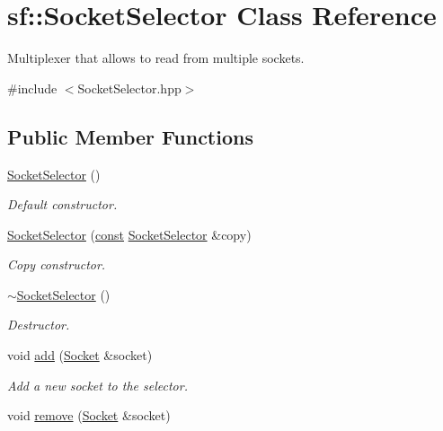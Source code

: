\hypertarget{classsf_1_1_socket_selector}{\section{sf\-:\-:Socket\-Selector Class Reference}
\label{classsf_1_1_socket_selector}
}


Multiplexer that allows to read from multiple sockets.  




{\ttfamily \#include $<$Socket\-Selector.\-hpp$>$}

\subsection*{Public Member Functions}
\begin{DoxyCompactItemize}
\item 
\hyperlink{classsf_1_1_socket_selector_a741959c5158aeb1e4457cad47d90f76b}{Socket\-Selector} ()
\begin{DoxyCompactList}\small\item\em Default constructor. \end{DoxyCompactList}\item 
\hyperlink{classsf_1_1_socket_selector_a50b1b955eb7ecb2e7c2764f3f4722fbf}{Socket\-Selector} (\hyperlink{term__entry_8h_a57bd63ce7f9a353488880e3de6692d5a}{const} \hyperlink{classsf_1_1_socket_selector}{Socket\-Selector} \&copy)
\begin{DoxyCompactList}\small\item\em Copy constructor. \end{DoxyCompactList}\item 
\hyperlink{classsf_1_1_socket_selector_a9069cd61208260b8ed9cf233afa1f73d}{$\sim$\-Socket\-Selector} ()
\begin{DoxyCompactList}\small\item\em Destructor. \end{DoxyCompactList}\item 
void \hyperlink{classsf_1_1_socket_selector_ade952013232802ff7b9b33668f8d2096}{add} (\hyperlink{classsf_1_1_socket}{Socket} \&socket)
\begin{DoxyCompactList}\small\item\em Add a new socket to the selector. \end{DoxyCompactList}\item 
void \hyperlink{classsf_1_1_socket_selector_a98b6ab693a65b82caa375639232357c1}{remove} (\hyperlink{classsf_1_1_socket}{Socket} \&socket)

\end{DoxyCompactItemize}
